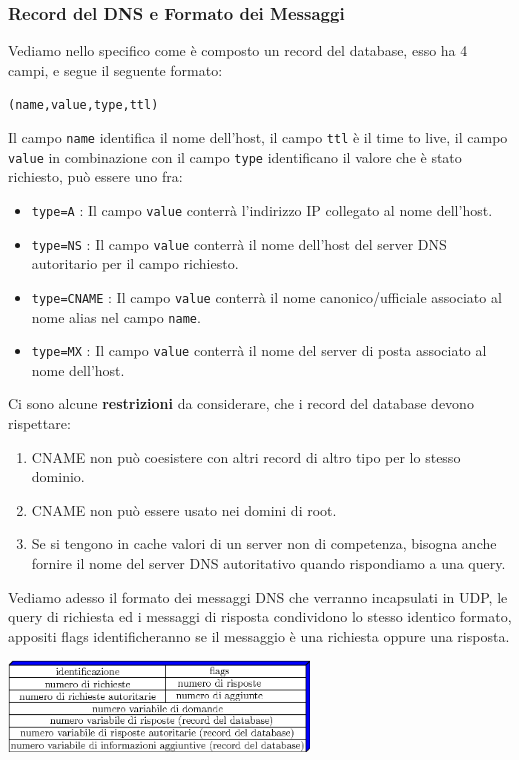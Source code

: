 \documentclass[12pt, letterpaper]{article}
\newcommand{\code}[1]{\colorbox{light-gray}{\texttt{#1}}}
\begin{document}
\subsubsection{Record del DNS e Formato dei Messaggi}
Vediamo nello specifico come è composto un record del database, esso ha 4 campi, e segue il seguente
formato:\begin{center}
    \code{(name,value,type,ttl)}
\end{center}
Il campo \code{name} identifica il nome dell'host, il campo \code{ttl} è il time to live, il campo
\code{value} in combinazione con il campo \code{type} identificano il valore che è stato richiesto, può
essere uno fra:\begin{itemize}
    \item \code{type=A} : Il campo \code{value} conterrà l'indirizzo IP collegato al nome dell'host.
    \item \code{type=NS} : Il campo \code{value} conterrà il nome dell'host del server DNS autoritario
          per il campo richiesto.
    \item \code{type=CNAME} :  Il campo \code{value} conterrà il nome canonico/ufficiale associato al nome
          alias nel campo \code{name}.
    \item \code{type=MX}  :  Il campo \code{value} conterrà il nome del server di posta associato al
          nome dell'host.
\end{itemize}
Ci sono alcune \textbf{restrizioni} da considerare, che i record del database devono rispettare:\begin{enumerate}
    \item CNAME non può coesistere con altri record di altro tipo per lo stesso
          dominio.
    \item CNAME non può essere usato nei domini di root.
    \item Se si tengono in cache valori di un server non di competenza,
          bisogna anche fornire il nome del server DNS autoritativo quando rispondiamo a una
          query.
\end{enumerate}
Vediamo adesso il formato dei messaggi DNS che verranno incapsulati in UDP, le query di richiesta ed i
messaggi di risposta condividono lo stesso identico formato, appositi flags identificheranno se il messaggio
è una richiesta oppure una risposta.\begin{center}
    \includegraphics[width=0.6\textwidth ]{images/messaggioDNS.eps}
\end{center}
\end{document}
